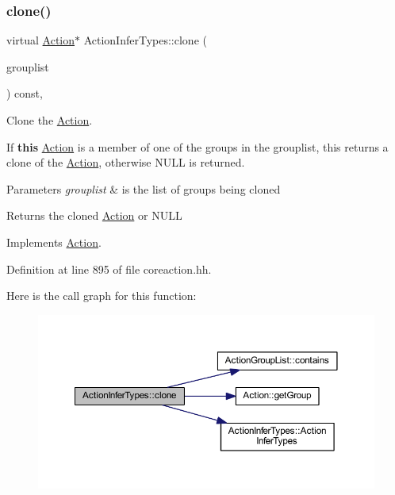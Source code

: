 \subsubsection{\texorpdfstring{clone()}{clone()}}
{\footnotesize\ttfamily virtual \mbox{\hyperlink{class_action}{Action}}$\ast$ Action\+Infer\+Types\+::clone (\begin{DoxyParamCaption}\item[{const \mbox{\hyperlink{class_action_group_list}{Action\+Group\+List}} \&}]{grouplist }\end{DoxyParamCaption}) const\hspace{0.3cm}{\ttfamily [inline]}, {\ttfamily [virtual]}}



Clone the \mbox{\hyperlink{class_action}{Action}}. 

If {\bfseries{this}} \mbox{\hyperlink{class_action}{Action}} is a member of one of the groups in the grouplist, this returns a clone of the \mbox{\hyperlink{class_action}{Action}}, otherwise N\+U\+LL is returned. 
\begin{DoxyParams}{Parameters}
{\em grouplist} & is the list of groups being cloned \\
\hline
\end{DoxyParams}
\begin{DoxyReturn}{Returns}
the cloned \mbox{\hyperlink{class_action}{Action}} or N\+U\+LL 
\end{DoxyReturn}


Implements \mbox{\hyperlink{class_action_af8242e41d09e5df52f97df9e65cc626f}{Action}}.



Definition at line 895 of file coreaction.\+hh.

Here is the call graph for this function\+:
\nopagebreak
\begin{figure}[H]
\begin{center}
\leavevmode
\includegraphics[width=350pt]{class_action_infer_types_ac986d89b2fed20d29ded26939f5a90b8_cgraph}
\end{center}
\end{figure}
\mbox{\label{class_action_infer_types_ae597b86eb6180b289bd0f32a607c6198}} 
